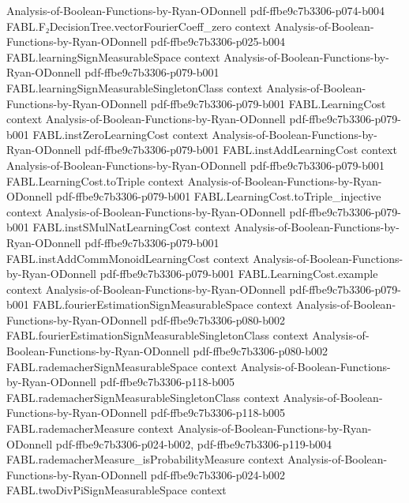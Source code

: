 \begin{theorem}
  {Analysis-of-Boolean-Functions-by-Ryan-ODonnell}
  {pdf-ffbe9c7b3306-p074-b004}
\proofstep
  {FABL.F₂DecisionTree.vectorFourierCoeff_zero}
  {context}
  {Analysis-of-Boolean-Functions-by-Ryan-ODonnell}
  {pdf-ffbe9c7b3306-p025-b004}
\proofstep
  {FABL.learningSignMeasurableSpace}
  {context}
  {Analysis-of-Boolean-Functions-by-Ryan-ODonnell}
  {pdf-ffbe9c7b3306-p079-b001}
\proofstep
  {FABL.learningSignMeasurableSingletonClass}
  {context}
  {Analysis-of-Boolean-Functions-by-Ryan-ODonnell}
  {pdf-ffbe9c7b3306-p079-b001}
\proofstep
  {FABL.LearningCost}
  {context}
  {Analysis-of-Boolean-Functions-by-Ryan-ODonnell}
  {pdf-ffbe9c7b3306-p079-b001}
\proofstep
  {FABL.instZeroLearningCost}
  {context}
  {Analysis-of-Boolean-Functions-by-Ryan-ODonnell}
  {pdf-ffbe9c7b3306-p079-b001}
\proofstep
  {FABL.instAddLearningCost}
  {context}
  {Analysis-of-Boolean-Functions-by-Ryan-ODonnell}
  {pdf-ffbe9c7b3306-p079-b001}
\proofstep
  {FABL.LearningCost.toTriple}
  {context}
  {Analysis-of-Boolean-Functions-by-Ryan-ODonnell}
  {pdf-ffbe9c7b3306-p079-b001}
\proofstep
  {FABL.LearningCost.toTriple_injective}
  {context}
  {Analysis-of-Boolean-Functions-by-Ryan-ODonnell}
  {pdf-ffbe9c7b3306-p079-b001}
\proofstep
  {FABL.instSMulNatLearningCost}
  {context}
  {Analysis-of-Boolean-Functions-by-Ryan-ODonnell}
  {pdf-ffbe9c7b3306-p079-b001}
\proofstep
  {FABL.instAddCommMonoidLearningCost}
  {context}
  {Analysis-of-Boolean-Functions-by-Ryan-ODonnell}
  {pdf-ffbe9c7b3306-p079-b001}
\proofstep
  {FABL.LearningCost.example}
  {context}
  {Analysis-of-Boolean-Functions-by-Ryan-ODonnell}
  {pdf-ffbe9c7b3306-p079-b001}
\proofstep
  {FABL.fourierEstimationSignMeasurableSpace}
  {context}
  {Analysis-of-Boolean-Functions-by-Ryan-ODonnell}
  {pdf-ffbe9c7b3306-p080-b002}
\proofstep
  {FABL.fourierEstimationSignMeasurableSingletonClass}
  {context}
  {Analysis-of-Boolean-Functions-by-Ryan-ODonnell}
  {pdf-ffbe9c7b3306-p080-b002}
\proofstep
  {FABL.rademacherSignMeasurableSpace}
  {context}
  {Analysis-of-Boolean-Functions-by-Ryan-ODonnell}
  {pdf-ffbe9c7b3306-p118-b005}
\proofstep
  {FABL.rademacherSignMeasurableSingletonClass}
  {context}
  {Analysis-of-Boolean-Functions-by-Ryan-ODonnell}
  {pdf-ffbe9c7b3306-p118-b005}
\proofstep
  {FABL.rademacherMeasure}
  {context}
  {Analysis-of-Boolean-Functions-by-Ryan-ODonnell}
  {pdf-ffbe9c7b3306-p024-b002,
    pdf-ffbe9c7b3306-p119-b004}
\proofstep
  {FABL.rademacherMeasure_isProbabilityMeasure}
  {context}
  {Analysis-of-Boolean-Functions-by-Ryan-ODonnell}
  {pdf-ffbe9c7b3306-p024-b002}
\proofstep
  {FABL.twoDivPiSignMeasurableSpace}
  {context}

\end{theorem}
